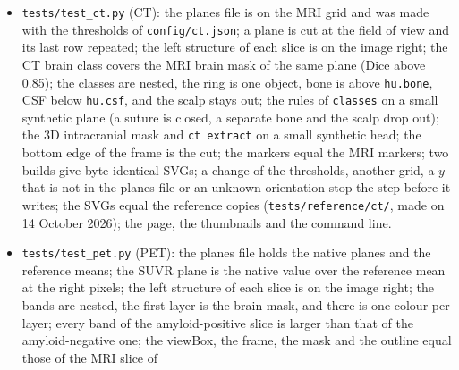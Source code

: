 \documentclass[10pt,a4paper]{article}
\newcommand{\code}[1]{\texttt{#1}}
\begin{document}
\begin{itemize}
(an odd holiAtlas label is a left structure: it lies at $x<0$, on the image right); the three masks are nested, the mask is one
object away from the image border, and the class shares are in a sane range; the masks are the same without the T1w channel, so
the skull stripping uses the labels only; the mask stays inside the intracranial volume, and bright pixels of the head (scalp)
lie outside it in every slice; the rules of the brain mask hold on a small synthetic label image; each marker centre is the
centroid of its labels, lies on its structure, inside the mask and the frame, and on the image right for a left structure; the
neurological build is the mirror image of the radiological one; two builds give byte-identical SVGs; one unit equals the WSI
unit; the SVGs equal the reference copies (\code{tests/reference/mri/}, made again on 14 October 2026 for the radiological
orientation); the page, the snippet, the CSS and the scan thumbnails; the slices step in an ASCII locale.
\item \code{tests/test\_ct.py} (CT): the planes file is on the MRI grid and was made with the thresholds of
\code{config/ct.json}; a plane is cut at the field of view and its last row repeated; the left structure of each slice is on
the image right; the CT brain class covers the MRI brain mask of the same plane (Dice above 0.85); the classes are nested, the
ring is one object, bone is above \code{hu.bone}, CSF below \code{hu.csf}, and the scalp stays out; the rules of
\code{classes} on a small synthetic plane (a suture is closed, a separate bone and the scalp drop out); the 3D intracranial
mask and \code{ct extract} on a small synthetic head; the bottom edge of the frame is the cut; the markers equal the MRI
markers; two builds give byte-identical SVGs; a change of the thresholds, another grid, a $y$ that is not in the planes
file or an unknown orientation stop the step before it writes; the SVGs equal the reference copies (\code{tests/reference/ct/},
made on 14 October 2026); the page, the thumbnails and the command line.
\item \code{tests/test\_pet.py} (PET): the planes file holds the native planes and the reference means; the SUVR plane is the
native value over the reference mean at the right pixels; the left structure of each slice is on the image right; the bands
are nested, the first layer is the brain mask, and there is one colour per layer; every band of the amyloid-positive slice is
larger than that of the amyloid-negative one; the viewBox, the frame, the mask and the outline equal those of the MRI slice of

\end{itemize}
\end{document}
